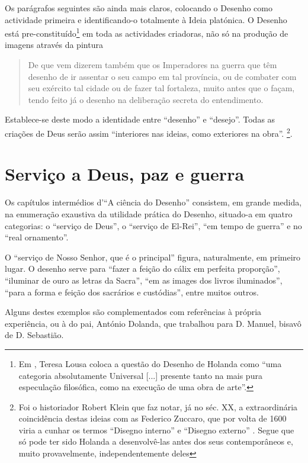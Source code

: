 \documentclass{article}
\begin{document}
Os parágrafos seguintes são ainda mais claros, colocando o Desenho
como actividade primeira e identificando-o totalmente à Ideia
platónica. O Desenho está pre-constituído\footnote{Em
  \cite{teresa-desenho}, Teresa Lousa coloca a questão do Desenho de
  Holanda como ``uma categoria absolutamente Universal [...] presente
  tanto na mais pura especulação filosófica, como na execução de uma
  obra de arte''.} em toda as actividades criadoras, não só na
produção de imagens através da pintura\cite[fl.37v]{holanda}

\begin{quote}
  De que vem dizerem também que os Imperadores na guerra que têm
  desenho de ir assentar o seu campo em tal província, ou de combater
  com seu exército tal cidade ou de fazer tal fortaleza, muito antes
  que o façam, tendo feito já o desenho na deliberação secreta do
  entendimento.
\end{quote}

Establece-se deste modo a identidade entre ``desenho'' e
``desejo''. Todas as criações de Deus serão assim ``interiores nas
ideias, como exteriores na obra''\cite[fl.37v]{holanda}. \footnote{Foi
  o historiador Robert Klein que faz notar, já no séc. XX, a
  extraordinária coincidência destas ideias com as Federico Zuccaro,
  que por volta de 1600 viria a cunhar os termos ``Disegno interno'' e
  ``Disegno externo'' . Segue que só pode ter sido Holanda a
  desenvolvê-las antes dos seus contemporâneos e, muito provavelmente,
  independentemente deles}.

\section{Serviço a Deus, paz e guerra }

Os capítulos intermédios d'``A ciência do Desenho'' consistem, em
grande medida, na enumeração exaustiva da utilidade prática do
Desenho, situado-a em quatro categorias: o ``serviço de Deus'', o
``serviço de El-Rei'', ``em tempo de guerra'' e no ``real ornamento''.

O ``serviço de Nosso Senhor, que é o principal''\cite[fl.38r]{holanda}
figura, naturalmente, em primeiro lugar. O desenho serve para ``fazer
a feição do cálix em perfeita proporção'', ``iluminar de ouro as
letras da Sacra'', ``em as images dos livros iluminados'', ``para a
forma e feição dos sacrários e custódias'', entre muitos outros.

Alguns destes exemplos são complementados com referências à própria
experiência, ou à do pai, António Dolanda, que trabalhou para
D. Manuel, bisavô de D. Sebastião.
\end{document}
